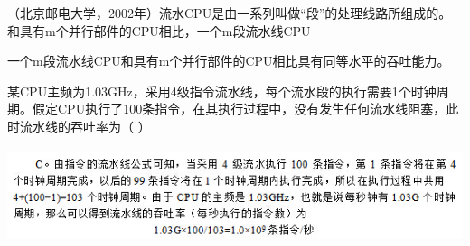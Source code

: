 \question （北京邮电大学，2002年）流水CPU是由一系列叫做``段''的处理线路所组成的。和具有m个并行部件的CPU相比，一个m段流水线CPU
\par{}
\begin{solution}一个m段流水线CPU和具有m个并行部件的CPU相比具有同等水平的吞吐能力。
\end{solution}
\question 某CPU主频为1.03GHz，采用4级指令流水线，每个流水段的执行需要1个时钟周期。假定CPU执行了100条指令，在其执行过程中，没有发生任何流水线阻塞，此时流水线的吞吐率为（
）
\par{}
\begin{solution}\includegraphics[width=5.73958in,height=1.09375in]{computerassets/7e707ae279824ceb7945f57d5c919616.jpeg}
\end{solution}
